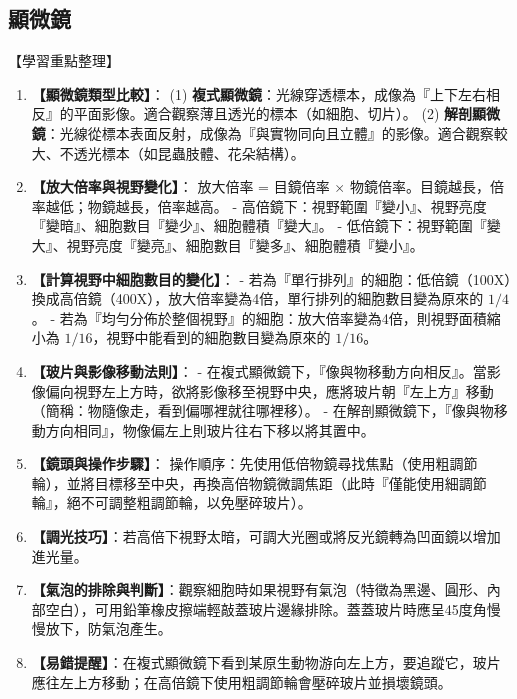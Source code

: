 \documentclass[11pt,a4paper]{article}
\begin{document}
\subsection{顯微鏡}
\begin{learningpoints}{【學習重點整理】}
\begin{enumerate}[label=\arabic*.]
  \item \textbf{【顯微鏡類型比較】}：
  (1) \textbf{複式顯微鏡}：光線穿透標本，成像為『上下左右相反』的平面影像。適合觀察薄且透光的標本（如細胞、切片）。
  (2) \textbf{解剖顯微鏡}：光線從標本表面反射，成像為『與實物同向且立體』的影像。適合觀察較大、不透光標本（如昆蟲肢體、花朵結構）。
  \item \textbf{【放大倍率與視野變化】}：
  放大倍率 = 目鏡倍率 $\times$ 物鏡倍率。目鏡越長，倍率越低；物鏡越長，倍率越高。
  - 高倍鏡下：視野範圍『變小』、視野亮度『變暗』、細胞數目『變少』、細胞體積『變大』。
  - 低倍鏡下：視野範圍『變大』、視野亮度『變亮』、細胞數目『變多』、細胞體積『變小』。
  \item \textbf{【計算視野中細胞數目的變化】}：
  - 若為『單行排列』的細胞：低倍鏡（100X）換成高倍鏡（400X），放大倍率變為4倍，單行排列的細胞數目變為原來的 $1/4$。
  - 若為『均勻分佈於整個視野』的細胞：放大倍率變為4倍，則視野面積縮小為 $1/16$，視野中能看到的細胞數目變為原來的 $1/16$。
  \item \textbf{【玻片與影像移動法則】}：
  - 在複式顯微鏡下，『像與物移動方向相反』。當影像偏向視野左上方時，欲將影像移至視野中央，應將玻片朝『左上方』移動（簡稱：物隨像走，看到偏哪裡就往哪裡移）。
  - 在解剖顯微鏡下，『像與物移動方向相同』，物像偏左上則玻片往右下移以將其置中。
  \item \textbf{【鏡頭與操作步驟】}：
  操作順序：先使用低倍物鏡尋找焦點（使用粗調節輪），並將目標移至中央，再換高倍物鏡微調焦距（此時『僅能使用細調節輪』，絕不可調整粗調節輪，以免壓碎玻片）。
  \item \textbf{【調光技巧】}：若高倍下視野太暗，可調大光圈或將反光鏡轉為凹面鏡以增加進光量。
  \item \textbf{【氣泡的排除與判斷】}：觀察細胞時如果視野有氣泡（特徵為黑邊、圓形、內部空白），可用鉛筆橡皮擦端輕敲蓋玻片邊緣排除。蓋蓋玻片時應呈45度角慢慢放下，防氣泡產生。
  \item \textbf{【易錯提醒】}：在複式顯微鏡下看到某原生動物游向左上方，要追蹤它，玻片應往左上方移動；在高倍鏡下使用粗調節輪會壓碎玻片並損壞鏡頭。
\end{enumerate}
\end{learningpoints}
\end{document}
